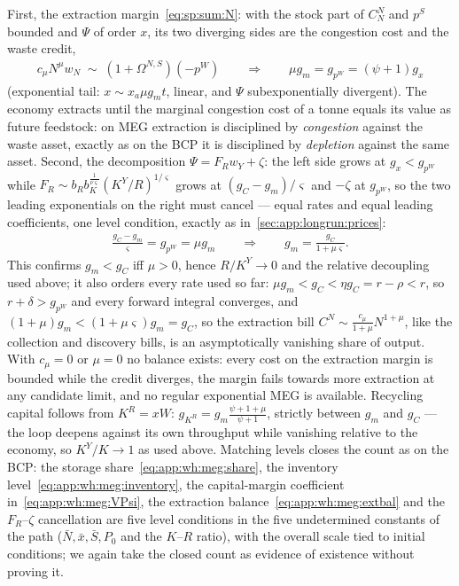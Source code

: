  First, the extraction margin~\eqref{eq:sp:sum:N}: with
the stock part of $C^N_N$ and $p^S$ bounded and $\Psi$ of order $x$, its two diverging sides
are the congestion cost and the waste credit,
\begin{align}
c_\mu N^\mu w_N\;\sim\;\left(1+\Omega^{N,S}\right)\left(-p^W\right)
\qquad\Longrightarrow\qquad
\mu g_m=g_{p^W}=\left(\psi+1\right)g_x
\label{eq:app:wh:meg:extbal}
\end{align}
(exponential tail: $x\sim x_a\mu g_mt$, linear, and $\Psi$ subexponentially divergent). The
economy extracts until the marginal congestion cost of a tonne equals its value as future
feedstock: on MEG extraction is disciplined by \emph{congestion} against the waste asset,
exactly as on the BCP it is disciplined by \emph{depletion} against the same asset. Second,
the decomposition $\Psi=F_Rw_Y+\zeta$: the left side grows at $g_x<g_{p^W}$ while
$F_R\sim b_Rb_K^{\frac{1}{\nu\varsigma}}\left(K^Y/R\right)^{1/\varsigma}$ grows at
$\left(g_C-g_m\right)/\varsigma$ and $-\zeta$ at $g_{p^W}$, so the two leading exponentials
on the right must cancel --- equal rates and equal leading coefficients, one level condition,
exactly as in~\ref{sec:app:longrun:prices}:
\begin{align}
\frac{g_C-g_m}{\varsigma}=g_{p^W}=\mu g_m
\qquad\Longrightarrow\qquad
g_m=\frac{g_C}{1+\mu\varsigma} .
\label{eq:app:wh:meg:pin}
\end{align}
This confirms $g_m<g_C$ iff $\mu>0$, hence $R/K^Y\to0$ and the relative decoupling used
above; it also orders every rate used so far:
$\mu g_m<g_C<\eta g_C=r-\rho<r$, so $r+\delta>g_{p^W}$ and every forward integral converges,
and $\left(1+\mu\right)g_m<\left(1+\mu\varsigma\right)g_m=g_C$, so the extraction bill
$C^N\sim\frac{c_\mu}{1+\mu}N^{1+\mu}$, like the collection and discovery bills, is an
asymptotically vanishing share of output. With $c_\mu=0$ or $\mu=0$ no balance exists: every
cost on the extraction margin is bounded while the credit diverges, the margin fails towards
more extraction at any candidate limit, and no regular exponential MEG is available.
Recycling capital follows from $K^R=xW$:
$g_{K^R}=g_m\frac{\psi+1+\mu}{\psi+1}$, strictly between $g_m$ and $g_C$ --- the loop deepens
against its own throughput while vanishing relative to the economy, so $K^Y/K\to1$ as used
above. Matching levels closes the count as on the BCP: the storage
share~\eqref{eq:app:wh:meg:share}, the inventory level~\eqref{eq:app:wh:meg:inventory}, the
capital-margin coefficient in~\eqref{eq:app:wh:meg:VPsi}, the extraction
balance~\eqref{eq:app:wh:meg:extbal} and the $F_R$--$\zeta$ cancellation are five level
conditions in the five undetermined constants of the path
($\bar N,\bar x,\bar S,P_0$ and the $K$--$R$ ratio), with the overall scale tied to initial
conditions; we again take the closed count as evidence of existence without proving it.

